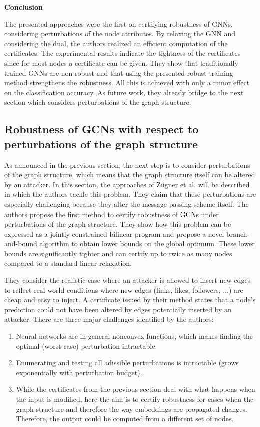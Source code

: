 \documentclass[a4paper,preprint]{sig-alternate}
\begin{document}
\vfill
\pagebreak

\textbf{Conclusion}\newline

The presented approaches were the first on certifying robustness of GNNs, considering perturbations of the node attributes.
By relaxing the GNN and considering the dual, the authors realized an efficient computation of the certificates.
The experimental results indicate the tightness of the certificates since for most nodes a certificate can be given.
They show that traditionally trained GNNs are non-robust and that using the presented robust training method strengthens the robustness.
All this is achieved with only a minor effect on the classification accuracy. 
As future work, they already bridge to the next section which considers perturbations of the graph structure.

\subsection{Robustness of GCNs with respect to perturbations of the graph structure}
\label{sec:paper_three}

As announced in the previous section, the next step is to consider perturbations of the graph structure,
which means that the graph structure itself can be altered by an attacker.
In this section, the approaches of Zügner et al. \cite{10.1145/3394486.3403217} will be described in which the authors
tackle this problem. They claim that these perturbations are especially challenging because they alter the message 
passing scheme itself. The authors propose the first method to certify robustness of GCNs under 
perturbations of the graph structure. They show how this problem can be expressed as a jointly constrained 
bilinear program and propose a novel branch-and-bound algorithm to obtain lower bounds on the global optimum. 
These lower bounds are significantly tighter and can certify up to twice as many nodes compared to a standard linear relaxation.\newline

They consider the realistic case where an attacker is allowed to insert new edges to reflect real-world
conditions where new edges (links, likes, followers, ...) are cheap and easy to inject.
A certificate issued by their method states that a node's prediction could not have been altered by edges potentially
inserted by an attacker. There are three major challenges identified by the authors:
\begin{enumerate}
    \item Neural networks are in general nonconvex functions, which makes finding the optimal (worst-case)
    perturbation intractable.
    \item Enumerating and testing all adissible perturbations is intractable (grows exponentially with perturbation budget).
    \item While the certificates from the previous section deal with what happens when the input is modified, here the
    aim is to certify robustness for cases when the graph structure and therefore the way embeddings are propagated changes.
    Therefore, the output could be computed from a different set of nodes.
\end{enumerate}
\end{document}
